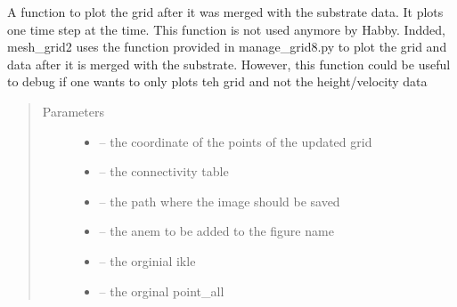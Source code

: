 \documentclass[letterpaper,10pt,english]{sphinxmanual}
\begin{document}
\begin{fulllineitems}
\label{\detokenize{index:src.mesh_grid2.fig_merge_grid}}
A function to plot the grid after it was merged with the substrate data.
It plots one time step at the time. This function is not used anymore by Habby. Indded, mesh\_grid2 uses the
function provided in manage\_grid8.py to plot the grid and data after it is merged with the substrate. However,
this function could be useful to debug if one wants to only plots teh grid and not the height/velocity data
\begin{quote}\begin{description}
\item[{Parameters}] \leavevmode\begin{itemize}
\item {} 
 -- the coordinate of the points of the updated grid

\item {} 
 -- the connectivity table

\item {} 
 -- the path where the image should be saved

\item {} 
 -- the anem to be added to the figure name

\item {} 
 -- the orginial ikle

\item {} 
 -- the orginal point\_all

\end{itemize}

\end{description}\end{quote}

\end{fulllineitems}

\end{document}
